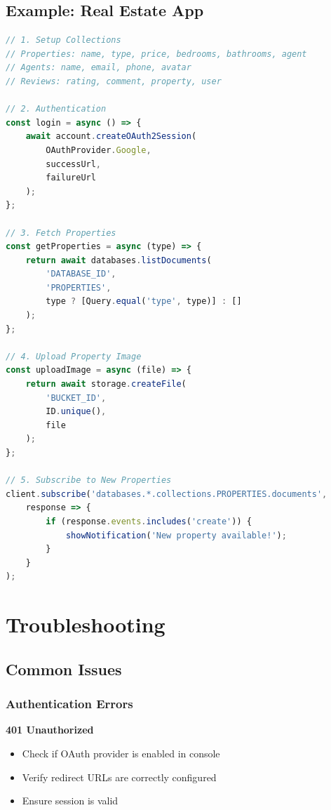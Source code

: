 \documentclass[11pt,a4paper,oneside]{book}
\begin{document}
\section{Example: Real Estate App}

\begin{lstlisting}[language=JavaScript, caption=Complete Real Estate Implementation]
// 1. Setup Collections
// Properties: name, type, price, bedrooms, bathrooms, agent
// Agents: name, email, phone, avatar
// Reviews: rating, comment, property, user

// 2. Authentication
const login = async () => {
    await account.createOAuth2Session(
        OAuthProvider.Google,
        successUrl,
        failureUrl
    );
};

// 3. Fetch Properties
const getProperties = async (type) => {
    return await databases.listDocuments(
        'DATABASE_ID',
        'PROPERTIES',
        type ? [Query.equal('type', type)] : []
    );
};

// 4. Upload Property Image
const uploadImage = async (file) => {
    return await storage.createFile(
        'BUCKET_ID',
        ID.unique(),
        file
    );
};

// 5. Subscribe to New Properties
client.subscribe('databases.*.collections.PROPERTIES.documents', 
    response => {
        if (response.events.includes('create')) {
            showNotification('New property available!');
        }
    }
);
\end{lstlisting}

\chapter{Troubleshooting}

\section{Common Issues}

\subsection{Authentication Errors}

\begin{warningbox}
\textbf{401 Unauthorized}
\begin{itemize}
    \item Check if OAuth provider is enabled in console
    \item Verify redirect URLs are correctly configured
    \item Ensure session is valid
\end{itemize}
\end{warningbox}
\end{document}

